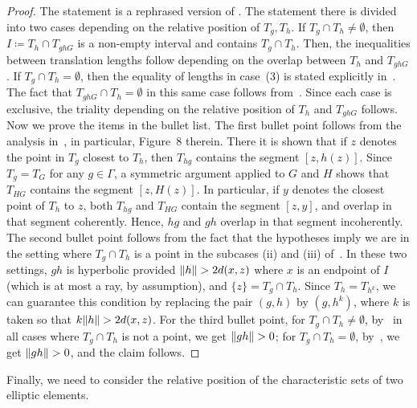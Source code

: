 \begin{proof}
The statement is a rephrased version of \cite[Proposition~1.7]{Pa89:Paulin1989TheGT}. The statement there is divided into two cases depending on the relative position of $T_g, T_h$.  
If $T_g \cap T_h \neq \emptyset$, then $I\coloneqq T_{h} \cap T_{ghG}$ is a non-empty interval and contains $T_g \cap T_h$.
Then, the inequalities between translation lengths follow depending on the overlap between $T_h$ and $T_{ghG}$.
If $T_g \cap T_h = \emptyset$, then the equality of lengths in
case~(3) is stated explicitly
in~\cite[1.5]{CM87:GroupActions}. The fact that
$T_{ghG} \cap T_h = \emptyset$ in this same case follows
from~\cite[1.7]{CM87:GroupActions}.
Since each case is exclusive, the triality depending on the relative position of $T_h$ and $T_{ghG}$ follows.
Now we prove the items in the bullet list.
The first bullet point follows from the analysis in~\cite[Proposition~1.7(2)]{Pa89:Paulin1989TheGT}, in particular, Figure~8 therein. There it is shown that if $z$ denotes the point in $T_g$ closest to $T_h$, then $T_{hg}$ contains the segment $[z,h(z)]$. Since $T_{g}=T_{G}$ for any $g \in \Gamma$, a symmetric argument applied to $G$ and $H$ shows that $T_{HG}$ contains the segment $[z,H(z)]$. In particular, if $y$ denotes the closest point of $T_h$ to $z$, both $T_{hg}$ and $T_{HG}$ contain the segment $[z,y]$, and overlap in that segment coherently. Hence, $hg$ and $gh$ overlap in that segment incoherently.
The second bullet point follows from the fact that the hypotheses imply we are in the setting where $T_g \cap T_h$ is a point in the subcases (ii) and (iii) of~\cite[Proposition~1.7 (1)]{Pa89:Paulin1989TheGT}. In these two settings, $gh$ is hyperbolic provided $\lVert h\rVert >2d(x,z)$
where $x$ is an endpoint of $I$ (which is at most a ray, by assumption), and $\{ z \} = T_g \cap T_h$. Since $T_h = T_{h^k}$, we can guarantee this condition by replacing the pair $(g,h)$ by $(g,h^k)$, where $k$ is taken so that $k\lVert h\rVert > 2d(x,z)$.
For the third bullet point, for $T_g \cap T_h \neq \emptyset$, by~\cite[Proposition~1.7 (1)]{Pa89:Paulin1989TheGT} in all cases where $T_g \cap T_h$ is not a point, we get $\lVert gh\rVert>0$;  for $T_g \cap T_h = \emptyset$, by~\cite[Proposition~1.7 (2)]{Pa89:Paulin1989TheGT}, we get $\lVert gh\rVert>0$, and the claim follows.
\end{proof}

Finally, we need to consider the relative position of the characteristic sets of two elliptic elements.

